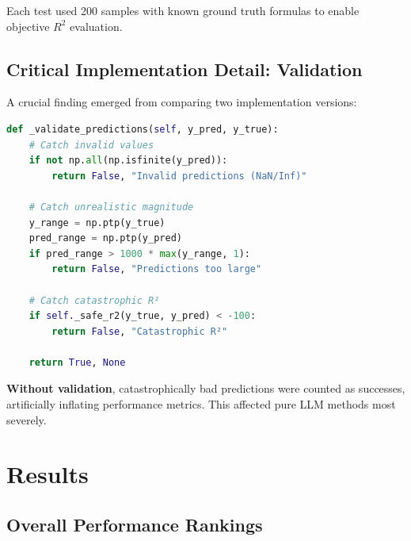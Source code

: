 \documentclass[11pt,a4paper]{article}
\begin{document}
Each test used 200 samples with known ground truth formulas to enable objective $R^2$ evaluation.

\subsection{Critical Implementation Detail: Validation}

A crucial finding emerged from comparing two implementation versions:

\begin{lstlisting}[language=Python, caption=Essential Validation Logic]
def _validate_predictions(self, y_pred, y_true):
    # Catch invalid values
    if not np.all(np.isfinite(y_pred)):
        return False, "Invalid predictions (NaN/Inf)"
    
    # Catch unrealistic magnitude
    y_range = np.ptp(y_true)
    pred_range = np.ptp(y_pred)
    if pred_range > 1000 * max(y_range, 1):
        return False, "Predictions too large"
    
    # Catch catastrophic R²
    if self._safe_r2(y_true, y_pred) < -100:
        return False, "Catastrophic R²"
    
    return True, None
\end{lstlisting}

\textbf{Without validation}, catastrophically bad predictions were counted as successes, artificially inflating performance metrics. This affected pure LLM methods most severely.

\section{Results}

\subsection{Overall Performance Rankings}
\end{document}
